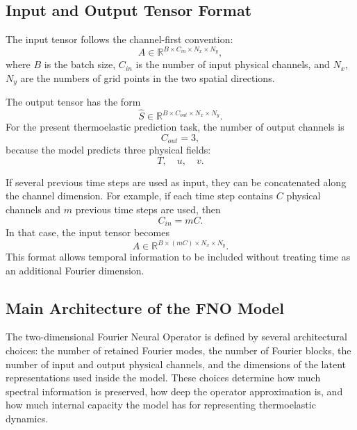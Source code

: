 \subsection{Input and Output Tensor Format}

The input tensor follows the channel-first convention:
\begin{equation}
A
\in
\mathbb{R}^{B \times C_{in} \times N_x \times N_y},
\end{equation}
where \(B\) is the batch size, \(C_{in}\) is the number of input physical channels, and \(N_x\), \(N_y\) are the numbers of grid points in the two spatial directions.

The output tensor has the form
\begin{equation}
\hat{S}
\in
\mathbb{R}^{B \times C_{out} \times N_x \times N_y}.
\end{equation}
For the present thermoelastic prediction task, the number of output channels is
\begin{equation}
C_{out}=3,
\end{equation}
because the model predicts three physical fields:
\begin{equation}
T, \quad u, \quad v.
\end{equation}

If several previous time steps are used as input, they can be concatenated along the channel dimension. For example, if each time step contains \(C\) physical channels and \(m\) previous time steps are used, then
\begin{equation}
C_{in}=mC.
\end{equation}
In that case, the input tensor becomes
\begin{equation}
A
\in
\mathbb{R}^{B \times (mC) \times N_x \times N_y}.
\end{equation}
This format allows temporal information to be included without treating time as an additional Fourier dimension.

\subsection{Main Architecture of the FNO Model}

The two-dimensional Fourier Neural Operator is defined by several architectural choices: the number of retained Fourier modes, the number of Fourier blocks, the number of input and output physical channels, and the dimensions of the latent representations used inside the model. These choices determine how much spectral information is preserved, how deep the operator approximation is, and how much internal capacity the model has for representing thermoelastic dynamics.

